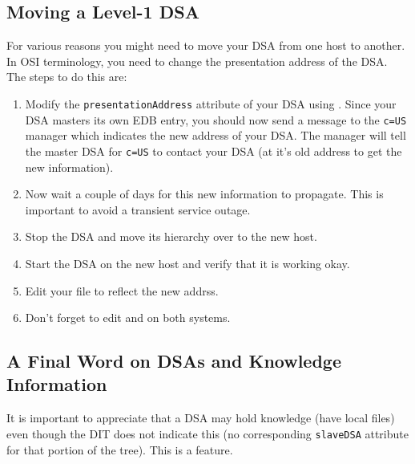 \subsection	{Moving a Level-1 DSA}
For various reasons you might need to move your DSA from one host to another.
In OSI terminology,
you need to change the presentation address of the DSA.
The steps to do this are:
\begin{enumerate}
\item	Modify the \verb"presentationAddress" attribute of your DSA using
.
Since your DSA masters its own EDB entry,
you should now send a message to the \verb"c=US" manager which indicates the
new address of your DSA.
The manager will tell the master DSA for \verb"c=US" to contact your DSA
(at it's old address to get the new information).

\item	Now wait a couple of days for this new information to propagate.
This is important to avoid a transient service outage.

\item	Stop the DSA and move its hierarchy over to the new host.

\item	Start the DSA on the new host and verify that it is working okay.

\item	Edit your  file to reflect the new addrss.

\item	Don't forget to edit  and 
on both systems.
\end{enumerate}



\subsection	{A Final Word on DSAs and Knowledge Information}
It is important to appreciate that a DSA may hold knowledge
(have local  files)
even though the DIT does not indicate this
(no corresponding \verb"slaveDSA" attribute for that portion of the tree).
This is a feature.


